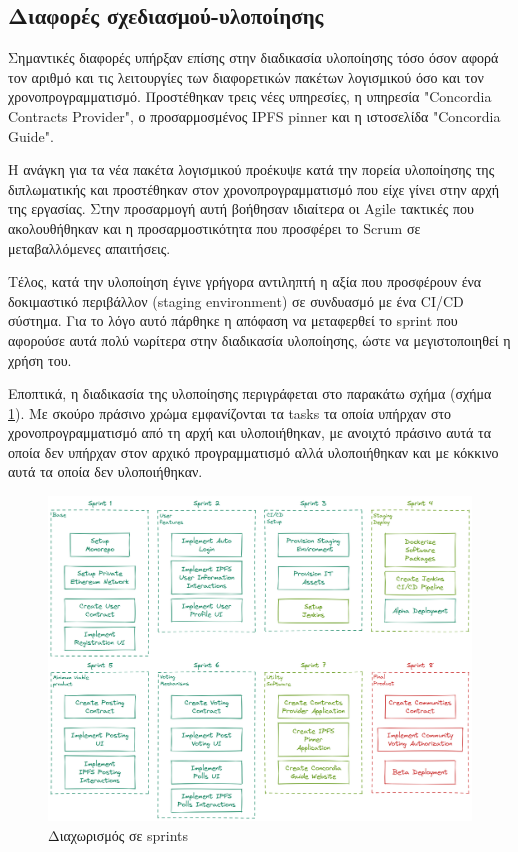 \subsection{Διαφορές σχεδιασμού-υλοποίησης} \label{subsection:4-6-1-design-implementation-differences}

Σημαντικές διαφορές υπήρξαν επίσης στην διαδικασία υλοποίησης τόσο όσον αφορά τον αριθμό και τις λειτουργίες των διαφορετικών πακέτων λογισμικού όσο και τον χρονοπρογραμματισμό. Προστέθηκαν τρεις νέες υπηρεσίες, η υπηρεσία "Concordia Contracts Provider", ο προσαρμοσμένος IPFS pinner και η ιστοσελίδα "Concordia Guide".

Η ανάγκη για τα νέα πακέτα λογισμικού προέκυψε κατά την πορεία υλοποίησης της διπλωματικής και προστέθηκαν στον χρονοπρογραμματισμό που είχε γίνει στην αρχή της εργασίας. Στην προσαρμογή αυτή βοήθησαν ιδιαίτερα οι Agile τακτικές που ακολουθήθηκαν και η προσαρμοστικότητα που προσφέρει το Scrum σε μεταβαλλόμενες απαιτήσεις.

Τέλος, κατά την υλοποίηση έγινε γρήγορα αντιληπτή η αξία που προσφέρουν ένα δοκιμαστικό περιβάλλον (staging environment) σε συνδυασμό με ένα CI/CD σύστημα. Για το λόγο αυτό πάρθηκε η απόφαση να μεταφερθεί το sprint που αφορούσε αυτά πολύ νωρίτερα στην διαδικασία υλοποίησης, ώστε να μεγιστοποιηθεί η χρήση του.

Εποπτικά, η διαδικασία της υλοποίησης περιγράφεται στο παρακάτω σχήμα (σχήμα \ref{figure:4.6.design-implementation-differences-sprints}). Με σκούρο πράσινο χρώμα εμφανίζονται τα tasks τα οποία υπήρχαν στο χρονοπρογραμματισμό από τη αρχή και υλοποιήθηκαν, με ανοιχτό πράσινο αυτά τα οποία δεν υπήρχαν στον αρχικό προγραμματισμό αλλά υλοποιήθηκαν και με κόκκινο αυτά τα οποία δεν υλοποιήθηκαν.

\begin{figure}[H]
    \centering
    \includegraphics[width=\textwidth]{assets/figures/chapter-4/4.6.design-implementation-differences-sprints.png}
    \caption{Διαχωρισμός σε sprints}
    \label{figure:4.6.design-implementation-differences-sprints}
\end{figure}
